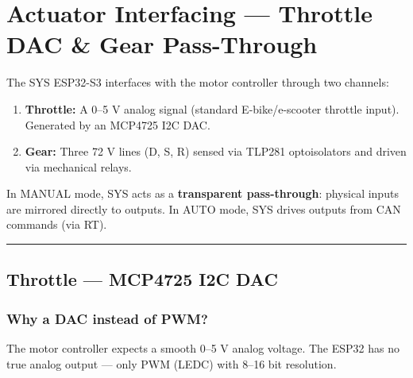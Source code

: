 \documentclass[12pt,a4paper,oneside]{report}
\providecommand{\tightlist}{\setlength{\itemsep}{0pt}\setlength{\parskip}{0pt}}
\begin{document}
\chapter{Actuator Interfacing --- Throttle DAC \& Gear
Pass-Through}\label{actuator-interfacing-throttle-dac-gear-pass-through}

The SYS ESP32-S3 interfaces with the motor controller through two channels:

\begin{enumerate}
\def\labelenumi{\arabic{enumi}.}
\tightlist
\item
  \textbf{Throttle:} A 0--5 V analog signal (standard E-bike/e-scooter throttle
  input). Generated by an MCP4725 I2C DAC.
\item
  \textbf{Gear:} Three 72 V lines (D, S, R) sensed via TLP281 optoisolators and
  driven via mechanical relays.
\end{enumerate}

In MANUAL mode, SYS acts as a \textbf{transparent pass-through}: physical inputs
are mirrored directly to outputs. In AUTO mode, SYS drives outputs from CAN
commands (via RT).

\begin{center}\rule{0.5\linewidth}{0.5pt}\end{center}

\section{Throttle --- MCP4725 I2C DAC}\label{throttle-mcp4725-i2c-dac}

\subsection{Why a DAC instead of PWM?}\label{why-a-dac-instead-of-pwm}

The motor controller expects a smooth 0--5 V analog voltage. The ESP32 has no
true analog output --- only PWM (LEDC) with 8--16 bit resolution.
\end{document}
